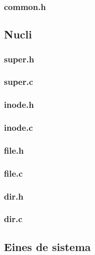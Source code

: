 \subsubsection{common.h}


\subsection{Nucli}


\subsubsection{super.h}

\subsubsection{super.c}


\subsubsection{inode.h}

\subsubsection{inode.c}


\subsubsection{file.h}

\subsubsection{file.c}


\subsubsection{dir.h}

\subsubsection{dir.c}


\subsection{Eines de sistema}

